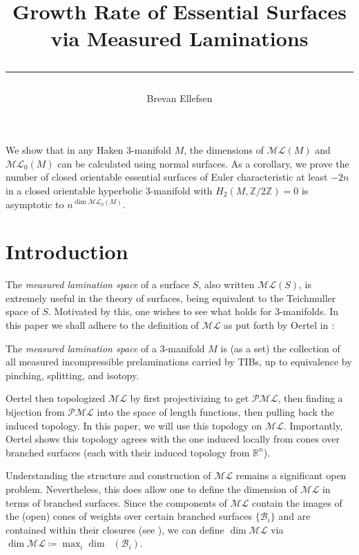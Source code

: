 \documentclass[12pt]{article}
\title{\vspace{-3 cm}Growth Rate of Essential Surfaces\vspace{-0.2 cm}\\via Measured Laminations\vspace{-0.5 cm} \\\rule{0.3\textwidth}{.4pt}
	\vspace{-0.7 cm}} %
\author{\small Brevan Ellefsen}
\date{}
\newcommand{\R}{\mathbb{R}}
\newcommand{\Z}{\mathbb{Z}}
\newcommand{\B}{\mathcal{B}}
\newcommand{\ML}{\mathcal{ML}}
\newcommand{\PML}{\mathcal{PML}}
\DeclareMathOperator{\cone}{cone^\circ}
\renewcommand{\it}{\textit}
\theoremstyle{nonumberdefinition}
\theoremstyle{empty}
\theoremstyle{empty}
\begin{document}
\maketitle
\thispagestyle{empty}
\begin{abstractNew}[Abstract.]
We show that in any Haken 3-manifold $M$, the dimensions of $\ML(M)$ and $\ML_0(M)$ can be calculated using normal surfaces. As a corollary, we prove the number of closed orientable essential surfaces of Euler characteristic at least $-2n$ in a closed orientable hyperbolic 3-manifold with $H_2(M,\Z/2\Z) = 0$ is asymptotic to $n^{\dim \ML_0(M)}$.
\end{abstractNew}


\tableofcontents


\section{Introduction}
The \it{measured lamination space} of a surface $S$, also written $\ML(S)$, is extremely useful in the theory of surfaces, being equivalent to the Teichmuller space of $S$. Motivated by this, one wishes to see what holds for $3$-manifolds. In this paper we shall adhere to the definition of $\ML$ as put forth by Oertel in \cite{oertelMeasuredLaminations3Manifolds1988}:

\begin{definition}[$\ML$]
	The \it{measured lamination space} of a 3-manifold $M$ is (as a set) the collection of all measured incompressible prelaminations carried by TIBs, up to equivalence by pinching, splitting, and isotopy.
\end{definition}

Oertel then topologized $\ML$ by first projectivizing to get $\PML$, then finding a bijection from $\PML$ into the space of length functions, then pulling back the induced topology. In this paper, we will use this topology on $\ML$. Importantly, Oertel shows this topology agrees with the one induced locally from cones over branched surfaces (each with their induced topology from $\R^n$).

Understanding the structure and construction of $\ML$ remains a significant open problem. Nevertheless, this does allow one to define the dimension of $\ML$ in terms of branched surfaces. Since the components of $\ML$ contain the images of the (open) cones of weights over certain branched surfaces $\{\B_i\}$ and are contained within their closures (see \cite{oertelMeasuredLaminations3Manifolds1988}), we can define $\dim \ML$ via $\dim \ML \coloneqq \max_i \dim \cone(\B_i)$.
\end{document}
